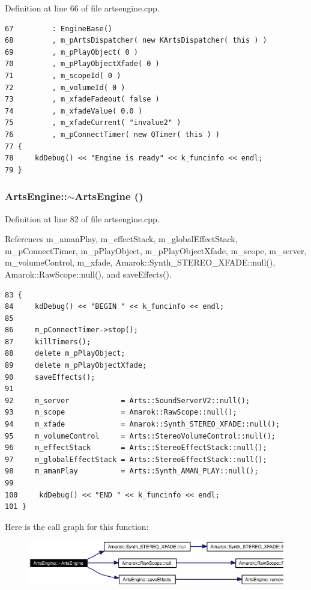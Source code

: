 Definition at line 66 of file artsengine.cpp.



\footnotesize\begin{verbatim}67         : EngineBase()
68         , m_pArtsDispatcher( new KArtsDispatcher( this ) )
69         , m_pPlayObject( 0 )
70         , m_pPlayObjectXfade( 0 )
71         , m_scopeId( 0 )
72         , m_volumeId( 0 )
73         , m_xfadeFadeout( false )
74         , m_xfadeValue( 0.0 )
75         , m_xfadeCurrent( "invalue2" )
76         , m_pConnectTimer( new QTimer( this ) )
77 {
78     kdDebug() << "Engine is ready" << k_funcinfo << endl;
79 }
\end{verbatim}\normalsize 
{}
\subsubsection{\setlength{\rightskip}{0pt plus 5cm}Arts\-Engine::$\sim${\bf Arts\-Engine} ()}\label{classArtsEngine_ArtsEnginea1}




Definition at line 82 of file artsengine.cpp.

References m\_\-aman\-Play, m\_\-effect\-Stack, m\_\-global\-Effect\-Stack, m\_\-p\-Connect\-Timer, m\_\-p\-Play\-Object, m\_\-p\-Play\-Object\-Xfade, m\_\-scope, m\_\-server, m\_\-volume\-Control, m\_\-xfade, Amarok::Synth\_\-STEREO\_\-XFADE::null(), Amarok::Raw\-Scope::null(), and save\-Effects().



\footnotesize\begin{verbatim}83 {
84     kdDebug() << "BEGIN " << k_funcinfo << endl;
85 
86     m_pConnectTimer->stop();
87     killTimers();
88     delete m_pPlayObject;
89     delete m_pPlayObjectXfade;
90     saveEffects();
91 
92     m_server            = Arts::SoundServerV2::null();
93     m_scope             = Amarok::RawScope::null();
94     m_xfade             = Amarok::Synth_STEREO_XFADE::null();
95     m_volumeControl     = Arts::StereoVolumeControl::null();
96     m_effectStack       = Arts::StereoEffectStack::null();
97     m_globalEffectStack = Arts::StereoEffectStack::null();
98     m_amanPlay          = Arts::Synth_AMAN_PLAY::null();
99 
100     kdDebug() << "END " << k_funcinfo << endl;
101 }
\end{verbatim}\normalsize 


Here is the call graph for this function:\begin{figure}[H]
\begin{center}
\leavevmode
\includegraphics[width=356pt]{classArtsEngine_ArtsEnginea1_cgraph}
\end{center}
\end{figure}



